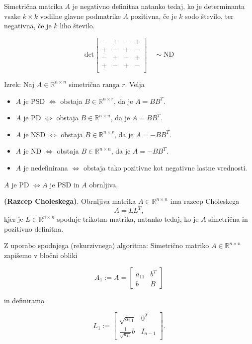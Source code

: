 \documentclass{article}
\begin{document}
\begin{multicols}{2}
Simetrična matrika \( A \) je negativno definitna natanko tedaj, ko je determinanta vsake \( k \times k \) vodilne glavne podmatrike \( A \) pozitivna, če je \( k \) sodo število, ter negativna, če je \( k \) liho število.

\[
\text{det} \left[
\begin{array}{cccc}
- & + & - & + \\
+ & - & + & - \\
- & + & - & + \\
+ & - & + & - \\
\end{array}
\right] \quad \sim \text{ND}
\]

Izrek: Naj \( A \in \mathbb{R}^{n \times n} \) simetrična ranga \( r \). Velja
\begin{itemize}
    \item \( A \) je PSD \( \Leftrightarrow \) obstaja \( B \in \mathbb{R}^{n \times r} \), da je \( A = BB^T \).
    \item \( A \) je PD \( \Leftrightarrow \) obstaja \( B \in \mathbb{R}^{n \times n} \), da je \( A = BB^T \).
    \item \( A \) je NSD \( \Leftrightarrow \) obstaja \( B \in \mathbb{R}^{n \times r} \), da je \( A = -BB^T \).
    \item \( A \) je ND \( \Leftrightarrow \) obstaja \( B \in \mathbb{R}^{n \times n} \), da je \( A = -BB^T \).
    \item \( A \) je nedefinirana \( \Leftrightarrow \) obstaja tako pozitivne kot negativne lastne vrednosti.
\end{itemize}
\( A \) je PD \( \Leftrightarrow A \) je PSD in \( A \) obrnljiva.

\textbf{(Razcep Choleskega)}. Obrnljiva matrika \( A \in \mathbb{R}^{n \times n} \) ima razcep Choleskega
\[ A = LL^T, \]
kjer je \( L \in \mathbb{R}^{n \times n} \) spodnje trikotna matrika, natanko tedaj, ko je \( A \) simetrična in pozitivno definitna.

Z uporabo spodnjega (rekurzivnega) algoritma:
Simetrično matriko \( A \in \mathbb{R}^{n \times n} \) zapišemo v bločni obliki

\[
A_1 := A = \begin{bmatrix}
a_{11} & b^T \\
b & B
\end{bmatrix}
\]

in definiramo

\[
L_1 := \begin{bmatrix}
\sqrt{a_{11}} & 0^T \\
\frac{1}{\sqrt{a_{11}}} b & I_{n-1}
\end{bmatrix}.
\]


\end{multicols}
\end{document}
